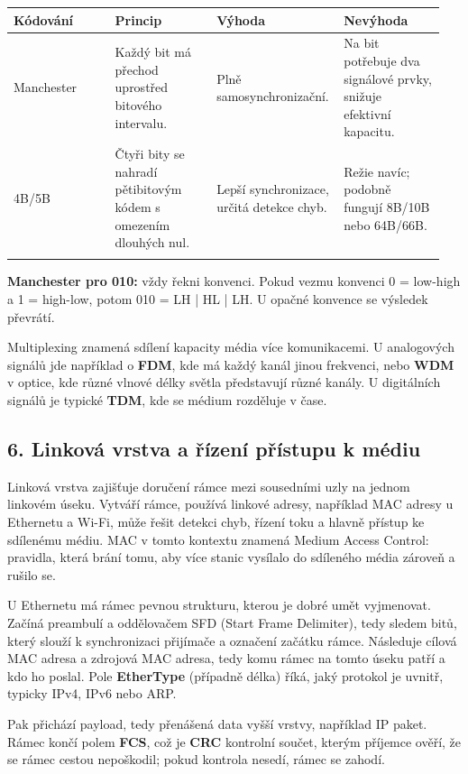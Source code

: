 \documentclass[11pt,a4paper]{article}
\newcommand{\itbox}[1]{\medskip\noindent\colorbox{black!6}{\parbox{\dimexpr\linewidth-2\fboxsep}{#1}}\medskip}
\begin{document}
\begin{longtable}{p{0.237\linewidth}p{0.237\linewidth}p{0.237\linewidth}p{0.237\linewidth}}
\toprule
\textbf{Kódování} & \textbf{Princip} & \textbf{Výhoda} & \textbf{Nevýhoda} \\
\midrule\endhead
Manchester & Každý bit má přechod uprostřed bitového intervalu. & Plně samosynchronizační. & Na bit potřebuje dva signálové prvky, snižuje efektivní kapacitu. \\
\addlinespace
4B/5B & Čtyři bity se nahradí pětibitovým kódem s omezením dlouhých nul. & Lepší synchronizace, určitá detekce chyb. & Režie navíc; podobně fungují 8B/10B nebo 64B/66B. \\
\addlinespace
\bottomrule
\end{longtable}

\itbox{\textbf{Manchester pro 010:} vždy řekni konvenci. Pokud vezmu konvenci 0 = low-high a 1 = high-low, potom 010 = LH | HL | LH. U opačné konvence se výsledek převrátí.}

Multiplexing znamená sdílení kapacity média více komunikacemi. U analogových signálů jde například o \textbf{FDM}, kde má každý kanál jinou frekvenci, nebo \textbf{WDM} v optice, kde různé vlnové délky světla představují různé kanály. U digitálních signálů je typické \textbf{TDM}, kde se médium rozděluje v čase.

\subsection*{6. Linková vrstva a řízení přístupu k médiu}

Linková vrstva zajišťuje doručení rámce mezi sousedními uzly na jednom linkovém úseku. Vytváří rámce, používá linkové adresy, například MAC adresy u Ethernetu a Wi-Fi, může řešit detekci chyb, řízení toku a hlavně přístup ke sdílenému médiu. MAC v tomto kontextu znamená Medium Access Control: pravidla, která brání tomu, aby více stanic vysílalo do sdíleného média zároveň a rušilo se.

U Ethernetu má rámec pevnou strukturu, kterou je dobré umět vyjmenovat. Začíná preambulí a oddělovačem SFD (Start Frame Delimiter), tedy sledem bitů, který slouží k synchronizaci přijímače a označení začátku rámce. Následuje cílová MAC adresa a zdrojová MAC adresa, tedy komu rámec na tomto úseku patří a kdo ho poslal. Pole \textbf{EtherType} (případně délka) říká, jaký protokol je uvnitř, typicky IPv4, IPv6 nebo ARP.

Pak přichází payload, tedy přenášená data vyšší vrstvy, například IP paket. Rámec končí polem \textbf{FCS}, což je \textbf{CRC} kontrolní součet, kterým příjemce ověří, že se rámec cestou nepoškodil; pokud kontrola nesedí, rámec se zahodí.
\end{document}
